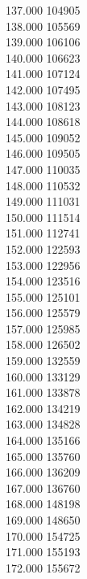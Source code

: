 { 137.000	104905 \\
 138.000	105569 \\
 139.000	106106 \\
 140.000	106623 \\
 141.000	107124 \\
 142.000	107495 \\
 143.000	108123 \\
 144.000	108618 \\
 145.000	109052 \\
 146.000	109505 \\
 147.000	110035 \\
 148.000	110532 \\
 149.000	111031 \\
 150.000	111514 \\
 151.000	112741 \\
 152.000	122593 \\
 153.000	122956 \\
 154.000	123516 \\
 155.000	125101 \\
 156.000	125579 \\
 157.000	125985 \\
 158.000	126502 \\
 159.000	132559 \\
 160.000	133129 \\
 161.000	133878 \\
 162.000	134219 \\
 163.000	134828 \\
 164.000	135166 \\
 165.000	135760 \\
 166.000	136209 \\
 167.000	136760 \\
 168.000	148198 \\
 169.000	148650 \\
 170.000	154725 \\
 171.000	155193 \\
 172.000	155672 \\
}
